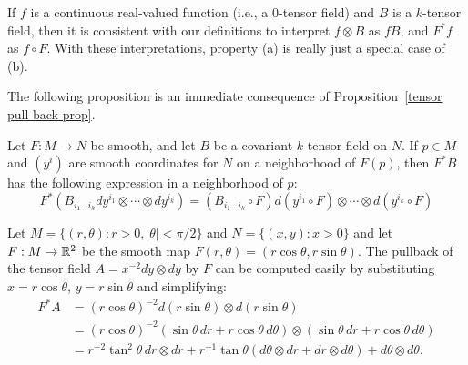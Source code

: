 If $f$ is a continuous real-valued function (i.e., a $0$-tensor field) and $B$ is a $k$-tensor field, then it is consistent with our definitions to interpret $f\otimes B$ as $fB$, and $F^*f$ as $f\circ F$. With these interpretations, property (a) is really just a special case of (b).\par
The following proposition is an immediate consequence of Proposition~\ref{tensor pull back prop}.
\begin{proposition}\label{tensor pullback formula}
Let $F:M\to N$ be smooth, and let $B$ be a covariant $k$-tensor field on $N$. If $p\in M$ and $(y^i)$ are smooth coordinates for $N$ on a neighborhood of $F(p)$, then $F^*B$ has the following expression in a neighborhood of $p$:
\[F^*(B_{i_1\dots i_k}dy^{i_1}\otimes\cdots\otimes dy^{i_k})=(B_{i_1\dots i_k}\circ F)d(y^{i_1}\circ F)\otimes\cdots\otimes d(y^{i_k}\circ F)\]
\end{proposition}
\begin{example}
Let $M=\{(r,\theta):r>0,|\theta|<\pi/2\}$ and $N=\{(x,y):x>0\}$ and let $F:M\to\mathbb{R}^2$ be the smooth map $F(r,\theta)=(r\cos\theta,r\sin\theta)$. The pullback of the tensor field $A=x^{-2}dy\otimes dy$ by $F$ can be computed easily by substituting $x=r\cos\theta$, $y=r\sin\theta$ and simplifying:
\begin{align*}
F^*A&=(r\cos\theta)^{-2}d(r\sin\theta)\otimes d(r\sin\theta)\\
&=(r\cos\theta)^{-2}(\sin\theta\,dr+r\cos\theta\,d\theta)\otimes(\sin\theta\,dr+r\cos\theta\,d\theta)\\
&=r^{-2}\tan^2\theta\,dr\otimes dr+r^{-1}\tan\theta(d\theta\otimes dr+dr\otimes d\theta)+d\theta\otimes d\theta.
\end{align*}
\end{example}
